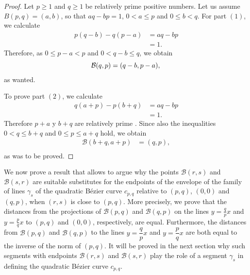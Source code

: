 \documentclass[12pt,english]{article}
\newcommand{\B}{\mathcal B}
\newcommand{\F}{\mathcal F}
\newcommand{\I}{\mathcal I}
\begin{document}
\begin{proof}
   Let $p\geq 1$ and $q\geq 1$ be relatively prime positive numbers. Let us assume $B(p,q)=(a,b)$, so that $aq-bp=1$, $0<a\leq p$ and $0\leq b<q$. For part $(1)$, we calculate
   \begin{align*}
       p(q-b)-q(p-a)&=aq-bp\\
                    &=1.
   \end{align*}
Therefore, as $0\leq p-a < p$ and $0< q-b\leq q$, we obtain 
\begin{equation*}
    \B(q,p) =(q-b,p-a),\\
\end{equation*}
as wanted.

To prove part $(2)$, we calculate
   \begin{align*}
       q(a+p)-p(b+q)&=aq-bp\\
                    &=1.
   \end{align*}
Therefore $p+a$ y  $b+q $ are relatively prime \cite[Theorem~5.1]{niven}. Since also the inequalities $0<q\leq b+q$ and $0\leq p \leq a+q$ hold,   we obtain
\begin{align*}
    \B(b+q,a+p)&=(q,p),\\
\end{align*}
as was to be proved.\qedhere
 
\end{proof}


We now prove a result that allows to argue why the points $\B(r,s)$ and $\B(s,r)$  are suitable substitutes for the endpoints of the envelope of the family of lines $\gamma_s$  of the quadratic B\'ezier curve $c_{p,q}$ relative to $(p,q)$, $(0,0)$ and $(q,p)$, when $(r,s)$ is close to $(p,q)$. More precisely, we prove that the distances from the projections of $\B(p,q)$ and $\B(q,p)$ on the lines $y=\frac{q}{p}x$ and $y=\frac{p}{q}x$ to $(p,q)$ and $(0,0)$, respectively, are equal. Furthermore, the distances from $\B(p,q)$ and $\B(q,p)$ to the lines $y=\dfrac{q}{p}x$ and $y=\dfrac{p}{q}x$ are both equal to the inverse of the norm of $(p,q)$.  It will be proved in the next section why such segments with endpoints $\B(r,s)$ and $\B(s,r)$  play the role of a segment $\gamma_{s}$ in defining the  quadratic B\'ezier curve $c_{p,q}$.
\end{document}
